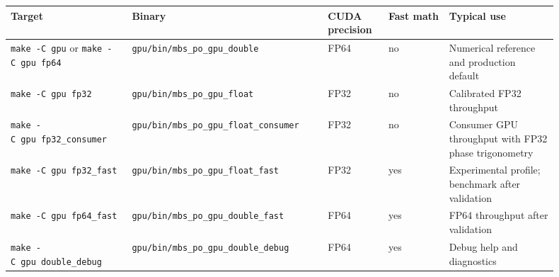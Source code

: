 \documentclass[
  10pt,
  a4paper,
]{article}
\newenvironment{Shaded}{}{}
\newcommand{\AttributeTok}[1]{\textcolor[rgb]{0.49,0.56,0.16}{#1}}
\newcommand{\CommentTok}[1]{\textcolor[rgb]{0.38,0.63,0.69}{\textit{#1}}}
\newcommand{\FunctionTok}[1]{\textcolor[rgb]{0.02,0.16,0.49}{#1}}
\newcommand{\NormalTok}[1]{#1}
\newcommand{\OperatorTok}[1]{\textcolor[rgb]{0.40,0.40,0.40}{#1}}
\newcommand{\VariableTok}[1]{\textcolor[rgb]{0.10,0.09,0.49}{#1}}
\begin{document}
\begin{Shaded}
\end{Shaded}

\begin{longtable}[]{@{}L{0.20\linewidth}L{0.32\linewidth}L{0.10\linewidth}L{0.10\linewidth}L{0.18\linewidth}@{}}
\toprule\noalign{}
Target & Binary & CUDA precision & Fast math & Typical use \\
\midrule\noalign{}
\endhead
\bottomrule\noalign{}
\endlastfoot
\texttt{make\ -C\ gpu} or \texttt{make\ -C\ gpu\ fp64} &
\nolinkurl{gpu/bin/mbs_po_gpu_double} & FP64 & no & Numerical reference and production default \\
\texttt{make\ -C\ gpu\ fp32} & \nolinkurl{gpu/bin/mbs_po_gpu_float} &
FP32 & no & Calibrated FP32 throughput \\
\texttt{make\ -C\ gpu\ fp32\_consumer} &
\nolinkurl{gpu/bin/mbs_po_gpu_float_consumer} & FP32 & no & Consumer GPU throughput with FP32 phase trigonometry \\
\texttt{make\ -C\ gpu\ fp32\_fast} &
\nolinkurl{gpu/bin/mbs_po_gpu_float_fast} & FP32 & yes & Experimental profile; benchmark after validation \\
\texttt{make\ -C\ gpu\ fp64\_fast} &
\nolinkurl{gpu/bin/mbs_po_gpu_double_fast} & FP64 & yes & FP64 throughput after validation \\
\texttt{make\ -C\ gpu\ double\_debug} &
\nolinkurl{gpu/bin/mbs_po_gpu_double_debug} & FP64 & yes & Debug help
and diagnostics \\
\end{longtable}
\end{document}
